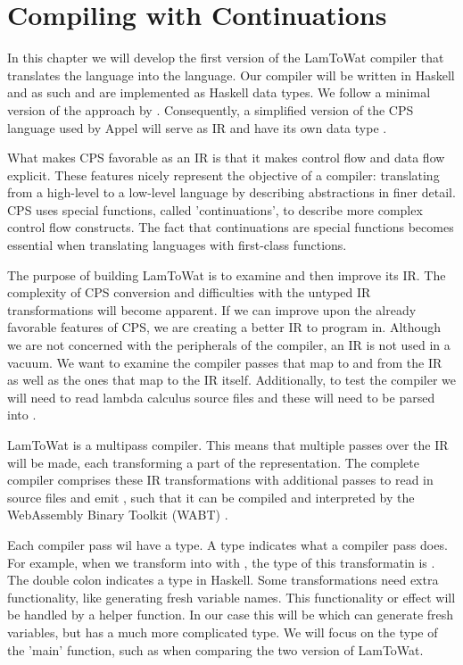 
\chapter{\label{chap:cpscomp}Compiling with Continuations}

In this chapter we will develop the first version of the LamToWat compiler that translates the  language into the  language. Our compiler will be written in Haskell \autocite{haskellhomepage} and as such  and  are implemented as Haskell data types. We follow a minimal version of the approach by \citeauthor{DBLP:books/daglib/0022396} \autocite{DBLP:books/daglib/0022396}. Consequently, a simplified version of the CPS language used by Appel will serve as IR and have its own data type . 

What makes CPS favorable as an IR is that it makes control flow and data flow explicit. These features nicely represent the objective of a compiler: translating from a high-level to a low-level language by describing abstractions in finer detail. CPS uses special functions, called 'continuations', to describe more complex control flow constructs. The fact that continuations are special functions becomes essential when translating languages with first-class functions.

The purpose of building LamToWat is to examine and then improve its IR. The complexity of CPS conversion and difficulties with the untyped IR transformations will become apparent. If we can improve upon the already favorable features of CPS, we are creating a better IR to program in. Although we are not concerned with the peripherals of the compiler, an IR is not used in a vacuum. We want to examine the compiler passes that map to and from the IR as well as the ones that map to the IR itself. Additionally, to test the compiler we will need to read lambda calculus source files and these will need to be parsed into .

LamToWat is a multipass compiler. This means that multiple passes over the IR will be made, each transforming a part of the representation. The complete compiler comprises these IR transformations with additional passes to read in source files and emit , such that it can be compiled and interpreted by the WebAssembly Binary Toolkit (WABT) \autocite{wabt}.

Each compiler pass wil have a type. A type indicates what a compiler pass does. For example, when we transform  into  with , the type of this transformatin is . The double colon indicates a type in Haskell. Some transformations need extra functionality, like generating fresh variable names. This functionality or effect will be handled by a helper function. In our case this will be  which can generate fresh variables, but has a much more complicated type. We will focus on the type of the 'main' function, such as  when comparing the two version of LamToWat.

